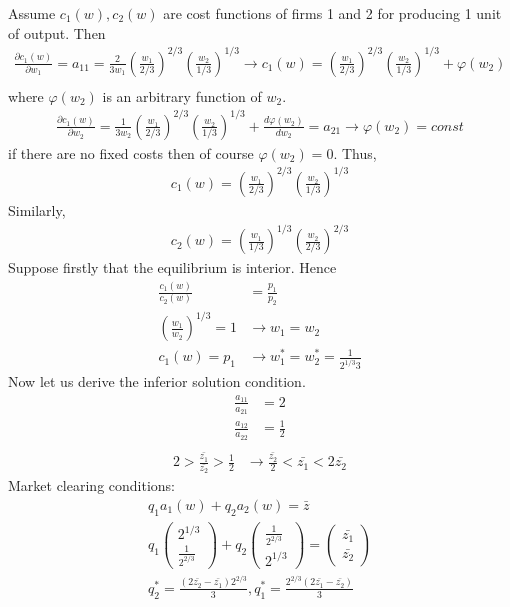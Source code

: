 \documentclass[a4paper]{article}
\begin{document}
Assume $c_1(w), c_2(w)$ are cost functions of firms 1 and 2 for producing 1 unit of output. Then
\begin{align*}
\frac{\partial c_1(w)}{\partial w_1} = a_{11} = \frac{2}{3w_1}\left(\frac{w_1}{2/3}\right)^{2/3}\left(\frac{w_2}{1/3}\right)^{1/3} \to c_1(w) =\left(\frac{w_1}{2/3}\right)^{2/3}\left(\frac{w_2}{1/3}\right)^{1/3} + \varphi(w_2)\\
\end{align*}
where $\varphi(w_2)$ is an arbitrary function of $w_2$.
\begin{align*}
\frac{\partial c_1(w)}{\partial w_2} = \frac{1}{3w_2}\left(\frac{w_1}{2/3}\right)^{2/3}\left(\frac{w_2}{1/3}\right)^{1/3} + \frac{d\varphi(w_2)}{dw_2} = a_{21} \to \varphi(w_2) = const
\end{align*}
if there are no fixed costs then of course $\varphi(w_2) = 0$. Thus, 
\begin{align*}
c_1(w) = \left(\frac{w_1}{2/3}\right)^{2/3}\left(\frac{w_2}{1/3}\right)^{1/3}
\end{align*}
Similarly, 
\begin{align*}
c_2(w) = \left(\frac{w_1}{1/3}\right)^{1/3}\left(\frac{w_2}{2/3}\right)^{2/3}
\end{align*}
Suppose firstly that the equilibrium is interior. Hence
\begin{align*}
\frac{c_1(w)}{c_2(w)} &= \frac{p_1}{p_2}\\
\left(\frac{w_1}{w_2}\right)^{1/3} = 1 &\to w_1 = w_2\\
c_1(w) = p_1 &\to w_1^* = w_2^* = \frac{1}{2^{1/3}3}
\end{align*}
Now let us derive the inferior solution condition.
\begin{align*}
\frac{a_{11}}{a_{21}} &= 2\\
\frac{a_{12}}{a_{22}} &= \frac{1}{2}\\
\end{align*}
\begin{align}\label{eq1}
2 > \frac{\bar{z_1}}{\bar{z_2}} > \frac{1}{2} &\to \frac{\bar{z_2}}{2} < \bar{z_1} < 2\bar{z_2}
\end{align}
Market clearing conditions:
\begin{align*}
q_1 a_1(w) + q_2 a_2(w) = \bar{z}\\
q_1 \begin{pmatrix}
2^{1/3}\\
\frac{1}{2^{2/3}}
\end{pmatrix} + q_2 \begin{pmatrix}
\frac{1}{2^{2/3}}\\
2^{1/3}
\end{pmatrix} = \begin{pmatrix}
\bar{z_1}\\
\bar{z_2}
\end{pmatrix}\\
q_2^* = \frac{(2\bar{z_2} - \bar{z_1})2^{2/3}}{3}, q_1^* = \frac{2^{2/3}(2\bar{z_1} - \bar{z_2})}{3}
\end{align*}
\end{document}

